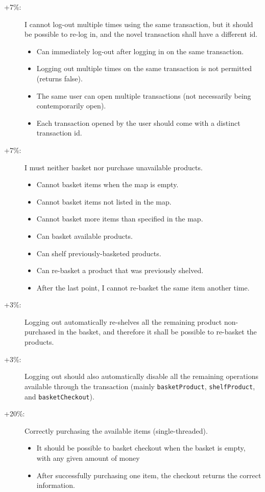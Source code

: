 \documentclass{article}
\begin{document}
\begin{itemize}
\begin{description}
\item [+7\%:] I cannot log-out multiple times using the same transaction, but it should be possible to re-log in, and the novel transaction shall have a different id.
\begin{itemize}
\item Can immediately log-out after logging in on the same transaction.
\item Logging out multiple times on the same transaction is not permitted (returns false).
\item The same user can open multiple transactions (not necessarily being contemporarily open).
\item Each transaction opened by the user should come with a distinct transaction id.
\end{itemize}
\item [+7\%:] I must neither basket nor purchase unavailable products.
\begin{itemize}
\item Cannot basket items when the map is empty.
\item Cannot basket items not listed in the map.
\item Cannot basket more items than specified in the map.
\item Can basket available products.
\item Can shelf previously-basketed products.
\item Can re-basket a product that was previously shelved.
\item After the last point, I cannot re-basket the same item another time.
\end{itemize}
\item [+3\%:] Logging out automatically re-shelves all the remaining product non-purchased in the basket, and therefore it shall be possible to re-basket the products.
\item [+3\%: ] Logging out should also automatically disable all the remaining operations available through the transaction (mainly \texttt{basketProduct}, \texttt{shelfProduct}, and \texttt{basketCheckout}).
\item [+20\%: ] Correctly purchasing the available items (single-threaded).
\begin{itemize}
\item It should be possible to basket checkout when the basket is empty, with any given amount of money
\item After successfully purchasing one item, the checkout returns the correct information.

\end{itemize}
\end{description}
\end{itemize}
\end{document}
